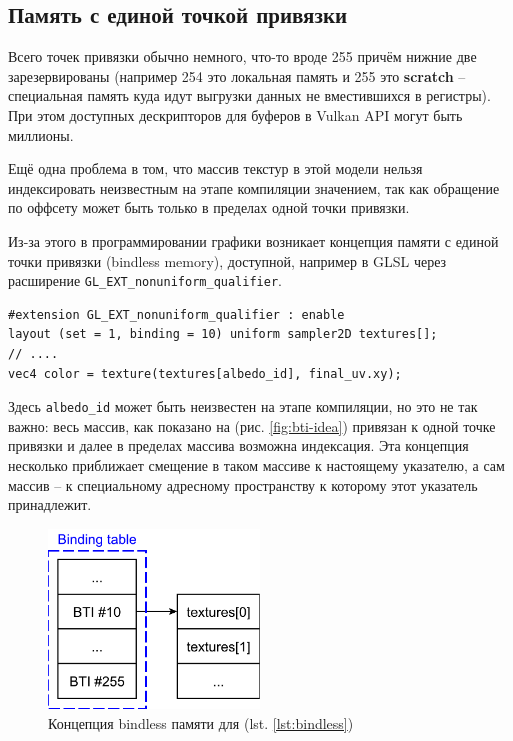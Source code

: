 \documentclass[a4paper,12pt,oneside]{article}
\begin{document}
\subsection{Память с единой точкой привязки}\label{subsec:bindless}

Всего точек привязки обычно немного, что-то вроде 255 причём нижние две зарезервированы (например 254 это локальная память и 255 это \textbf{scratch} -- специальная память куда идут выгрузки данных не вместившихся в регистры).
При этом доступных дескрипторов для буферов в Vulkan API могут быть миллионы.

Ещё одна проблема в том, что массив текстур в этой модели нельзя индексировать неизвестным на этапе компиляции значением, так как обращение по оффсету может быть только в пределах одной точки привязки.

Из-за этого в программировании графики возникает концепция памяти с единой точки привязки (bindless memory), доступной, например в GLSL через расширение \lstinline!GL_EXT_nonuniform_qualifier!.

\begin{lstlisting}[caption={Работа с bindless памятью на GLSL},label={lst:bindless}]
#extension GL_EXT_nonuniform_qualifier : enable
layout (set = 1, binding = 10) uniform sampler2D textures[];
// ....
vec4 color = texture(textures[albedo_id], final_uv.xy);
\end{lstlisting}

Здесь \lstinline!albedo_id! может быть неизвестен на этапе компиляции, но это не так важно: весь массив, как показано на (рис. \ref{fig:bti-idea}) привязан к одной точке привязки и далее в пределах массива возможна индексация.
Эта концепция несколько приближает смещение в таком массиве к настоящему указателю, а сам массив -- к специальному адресному пространству к которому этот указатель принадлежит.

\begin{figure}
\centering
\includegraphics[width=0.5\textwidth]{pictures/bindless-idea.pdf}
\caption{Концепция bindless памяти для (lst. \ref{lst:bindless})}
\label{fig:bindless-idea}
\end{figure}
\end{document}
